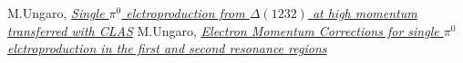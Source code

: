\begin{thebibliography}{mybib}
     {M.Ungaro},  \href{https://maureeungaro.github.io/home/meson/pi0_delta/pi0_delta}     {\it Single $\pi^0$ elctroproduction from $\Delta(1232)$ at high momentum transferred with CLAS}
     {M.Ungaro},  \href{https://maureeungaro.github.io/home/meson/pi0_resonance/e_kin_cor} {\it Electron Momentum Corrections  for single $\pi^0$ elctroproduction in the first and second resonance regions}
\end{thebibliography}

